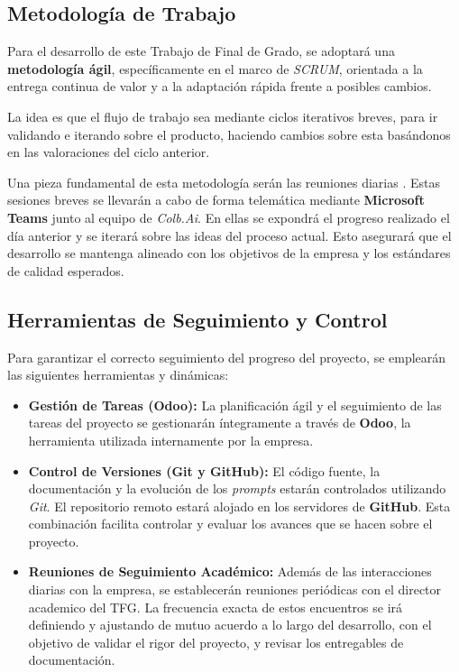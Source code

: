 \documentclass[11pt, letterpaper]{article}
\begin{document}
\subsection{Metodología de Trabajo}
Para el desarrollo de este Trabajo de Final de Grado, se adoptará una \textbf{metodología ágil}, específicamente en el marco de \textit{SCRUM}, orientada a la entrega continua de valor y a la adaptación rápida frente a posibles cambios. 

La idea es que el flujo de trabajo sea mediante ciclos iterativos breves, para ir validando e iterando sobre el producto, haciendo cambios sobre esta basándonos en las valoraciones del ciclo anterior. \cite{modul2_1} \cite{schwaber_scrum_2020}

Una pieza fundamental de esta metodología serán las reuniones diarias . Estas sesiones breves se llevarán a cabo de forma telemática mediante \textbf{Microsoft Teams} junto al equipo de \textit{Colb.Ai}. En ellas se expondrá el progreso realizado el día anterior y se iterará sobre las ideas del proceso actual. Esto asegurará que el desarrollo se mantenga alineado con los objetivos de la empresa y los estándares de calidad esperados.

\subsection{Herramientas de Seguimiento y Control}
Para garantizar el correcto seguimiento del progreso del proyecto, se emplearán las siguientes herramientas y dinámicas:

\begin{itemize}
    \item \textbf{Gestión de Tareas (Odoo):} La planificación ágil y el seguimiento de las tareas del proyecto se gestionarán íntegramente a través de \textbf{Odoo}, la herramienta utilizada internamente por la empresa.
    
    \item \textbf{Control de Versiones (Git y GitHub):} El código fuente, la documentación y la evolución de los \textit{prompts} estarán controlados utilizando \textit{Git}. El repositorio remoto estará alojado en los servidores de \textbf{GitHub}. Esta combinación facilita controlar y evaluar los avances que se hacen sobre el proyecto.
    
    \item \textbf{Reuniones de Seguimiento Académico:} Además de las interacciones diarias con la empresa, se establecerán reuniones periódicas con el director academico del TFG. La frecuencia exacta de estos encuentros se irá definiendo y ajustando de mutuo acuerdo a lo largo del desarrollo, con el objetivo de validar el rigor del proyecto, y revisar los entregables de documentación.
\end{itemize}
\end{document}
